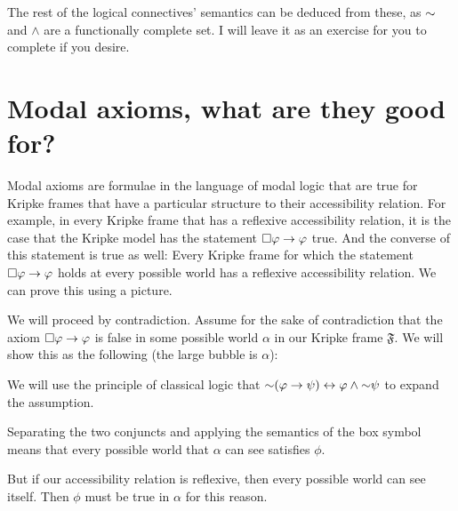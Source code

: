 The rest of the logical connectives' semantics can be deduced from these, as $\mathord{\sim}$ and $\wedge$ are a functionally 
complete set. I will leave it as an exercise for you to complete if you desire.

\section{Modal axioms, what are they good for?}
Modal axioms are formulae in the language of modal logic that are true for Kripke frames that have a particular structure
to their accessibility relation. For example, in every Kripke frame that has a reflexive accessibility relation,
it is the case that the Kripke model has the statement $\square \varphi \rightarrow \varphi$ true. And the converse of this 
statement is true as well: Every Kripke frame for which the statement $\square \varphi \rightarrow \varphi$ holds at every possible
world has a reflexive accessibility relation. We can prove this using a picture. 

We will proceed by contradiction. Assume for the sake of contradiction that the axiom $\square \varphi \rightarrow \varphi$
is false in some possible world $\alpha$ in our Kripke frame $\mathfrak{F}$. We will show this as the following
(the large bubble is $\alpha$):

\begin{center}
    
\end{center}

We will use the principle of classical logic that $\mathord{\sim}(\varphi \rightarrow \psi) \leftrightarrow \varphi \wedge \mathord{\sim} \psi$
to expand the assumption.

\begin{center}
    
\end{center}

Separating the two conjuncts and applying the semantics of the box symbol means that every possible world that $\alpha$ can see
satisfies $\phi$. 

\begin{center}
    
\end{center}

But if our accessibility relation is reflexive, then every possible world can see itself. Then $\phi$ must be true in $\alpha$
for this reason. 

\begin{center}
    
\end{center}

